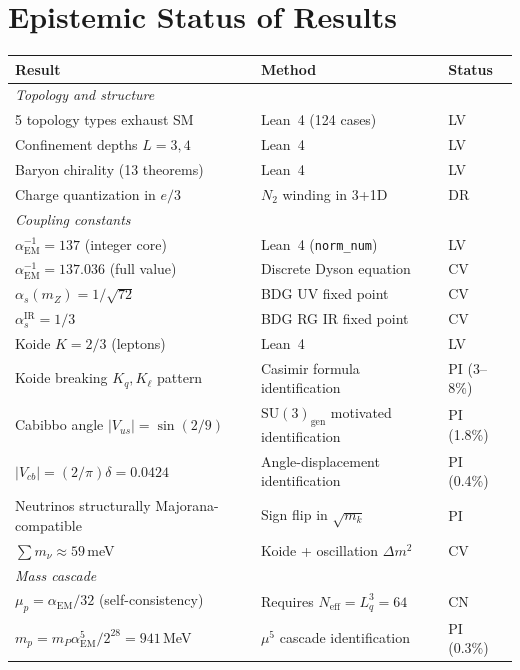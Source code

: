 \documentclass[11pt]{article}
\begin{document}
\section{Epistemic Status of Results}
\label{sec:status}

\begin{center}
\small
\begin{tabular}{lll}
\toprule
Result & Method & Status \\
\midrule
\multicolumn{3}{l}{\textit{Topology and structure}} \\
5 topology types exhaust SM & Lean~4 (124 cases) & LV \\
Confinement depths $L=3,4$ & Lean~4 & LV \\
Baryon chirality (13 theorems) & Lean~4 & LV \\
Charge quantization in $e/3$ & $N_2$ winding in 3+1D & DR \\
\midrule
\multicolumn{3}{l}{\textit{Coupling constants}} \\
$\alpha_{\mathrm{EM}}^{-1}=137$ (integer core) & Lean~4 (\texttt{norm\_num}) & LV \\
$\alpha_{\mathrm{EM}}^{-1}=137.036$ (full value) & Discrete Dyson equation & CV \\
$\alpha_s(m_Z)=1/\sqrt{72}$ & BDG UV fixed point & CV \\
$\alpha_s^{\mathrm{IR}}=1/3$ & BDG RG IR fixed point & CV \\
Koide $K=2/3$ (leptons) & Lean~4 & LV \\
Koide breaking $K_q,K_\ell$ pattern & Casimir formula identification & PI (3--8\%) \\
Cabibbo angle $|V_{us}|=\sin(2/9)$ & $\mathrm{SU}(3)_{\mathrm{gen}}$ motivated identification & PI (1.8\%) \\
$|V_{cb}|=(2/\pi)\delta=0.0424$ & Angle-displacement identification & PI (0.4\%) \\
Neutrinos structurally Majorana-compatible & Sign flip in $\sqrt{m_k}$ & PI \\
$\sum m_\nu\approx 59$\,meV & Koide + oscillation $\Delta m^2$ & CV \\
\midrule
\multicolumn{3}{l}{\textit{Mass cascade}} \\
$\mu_p=\alpha_{\mathrm{EM}}/32$ (self-consistency) & Requires $N_{\mathrm{eff}}=L_q^3=64$ & CN \\
$m_p=m_P\alpha_{\mathrm{EM}}^5/2^{28}=941$\,MeV & $\mu^5$ cascade identification & PI (0.3\%) \\

\end{tabular}
\end{center}
\end{document}

